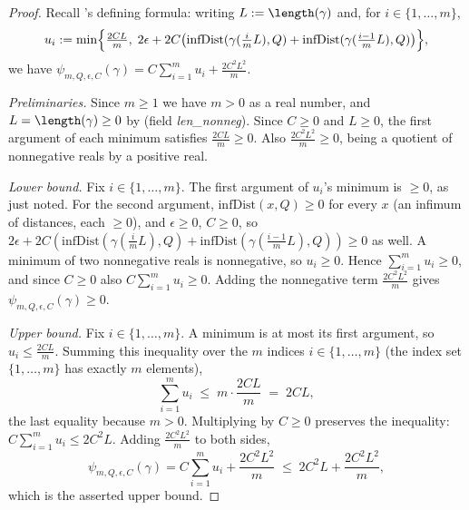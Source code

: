 \begin{proof}
  Recall 's defining formula: writing $L := \length(\gamma)$ and, for
  $i \in \{1,\dots,m\}$,
  \[
    u_i := \min\Bigl\{\tfrac{2CL}{m},\;
      2\epsilon + 2C\bigl(\mathrm{infDist}(\gamma(\tfrac{i}{m}L),Q)
        + \mathrm{infDist}(\gamma(\tfrac{i-1}{m}L),Q)\bigr)\Bigr\}
    ,
  \]
  we have $\psi_{m,Q,\epsilon,C}(\gamma) = C\sum_{i=1}^m u_i + \frac{2C^2L^2}{m}$.

  \emph{Preliminaries.} Since $m \ge 1$ we have $m > 0$ as a real number, and
  $L = \length(\gamma) \ge 0$ by  (field \emph{len\_nonneg}). Since $C \ge 0$ and
  $L \ge 0$, the first argument of each minimum satisfies $\tfrac{2CL}{m} \ge 0$. Also
  $\tfrac{2C^2L^2}{m} \ge 0$, being a quotient of nonnegative reals by a positive real.

  \emph{Lower bound.} Fix $i \in \{1,\dots,m\}$. The first argument of $u_i$'s minimum is
  $\ge 0$, as just noted. For the second argument, $\mathrm{infDist}(x,Q) \ge 0$ for every $x$ (an
  infimum of distances, each $\ge 0$), and $\epsilon \ge 0$, $C \ge 0$, so
  $2\epsilon + 2C(\mathrm{infDist}(\gamma(\tfrac{i}{m}L),Q) +
  \mathrm{infDist}(\gamma(\tfrac{i-1}{m}L),Q)) \ge 0$ as well. A minimum of two nonnegative reals is
  nonnegative, so $u_i \ge 0$. Hence $\sum_{i=1}^m u_i \ge 0$, and since $C \ge 0$ also
  $C\sum_{i=1}^m u_i \ge 0$. Adding the nonnegative term $\tfrac{2C^2L^2}{m}$ gives
  $\psi_{m,Q,\epsilon,C}(\gamma) \ge 0$.

  \emph{Upper bound.} Fix $i \in \{1,\dots,m\}$. A minimum is at most its first argument, so
  $u_i \le \tfrac{2CL}{m}$. Summing this inequality over the $m$ indices
  $i \in \{1,\dots,m\}$ (the index set $\{1,\dots,m\}$ has exactly $m$ elements),
  \[
    \sum_{i=1}^m u_i \;\le\; m \cdot \frac{2CL}{m} \;=\; 2CL
    ,
  \]
  the last equality because $m > 0$. Multiplying by $C \ge 0$ preserves the inequality:
  $C\sum_{i=1}^m u_i \le 2C^2L$. Adding $\tfrac{2C^2L^2}{m}$ to both sides,
  \[
    \psi_{m,Q,\epsilon,C}(\gamma) = C\sum_{i=1}^m u_i + \frac{2C^2L^2}{m}
      \;\le\; 2C^2L + \frac{2C^2L^2}{m}
    ,
  \]
  which is the asserted upper bound.
\end{proof}
